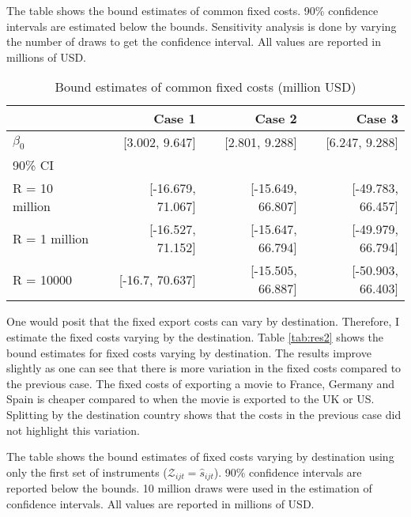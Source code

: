 \documentclass[11pt, letterpaper]{article} \usepackage{amsmath}
\newcommand{\floatintro}[1]{
  
  \vspace*{0.1in}
  
  {\footnotesize

    #1
    
  }
  
  \vspace*{0.1in} } \newcommand{\Hline}{\noindent\rule{18cm}{0.5pt}}
\begin{document}
\begin{table}[htbp!]
  \floatintro{The table shows the bound estimates of common fixed
    costs. 90\% confidence intervals are estimated below the
    bounds. Sensitivity analysis is done by varying the number of
    draws to get the confidence interval. All values are reported in
    millions of USD.}
  \centering
  \begin{tabular}{lrrr}
    \hline
    & Case 1 & Case 2 & Case 3 \\
    \hline
    $\beta_0$ & {[}3.002, 9.647{]} & {[}2.801, 9.288{]} & {[}6.247, 9.288{]} \\
    90\% CI &  &  &  \\
    R = 10 million & {[}-16.679, 71.067{]} & {[}-15.649, 66.807{]} & {[}-49.783, 66.457{]} \\
    R = 1 million & {[}-16.527, 71.152{]} & {[}-15.647, 66.794{]} & {[}-49.979, 66.794{]} \\
    R = 10000 & {[}-16.7, 70.637{]} & {[}-15.505, 66.887{]} &
                                                              {[}-50.903, 66.403{]}\\
    \hline
  \end{tabular}
  \caption{Bound estimates of common fixed costs (million USD)}
  \label{tab:res1}
\end{table}
One would posit that the fixed export costs can vary by
destination. Therefore, I estimate the fixed costs varying by the
destination. Table \ref{tab:res2} shows the bound estimates for fixed
costs varying by destination. The results improve slightly as one can
see that there is more variation in the fixed costs compared to the
previous case. The fixed costs of exporting a movie to France, Germany
and Spain is cheaper compared to when the movie is exported to the UK
or US. Splitting by the destination country shows that the costs in
the previous case did not highlight this variation.
\begin{table}[htbp!]
  \floatintro{The table shows the bound estimates of fixed costs
    varying by destination using only the first set of instruments
    ($\mathcal{Z}_{ijt} = \hat s_{ijt}$). 90\% confidence intervals are reported
    below the bounds. 10 million draws were used in the estimation of
    confidence intervals. All values are
    reported in millions of USD.}
  \centering
  \caption{Bound estimates of fixed costs varying by destination
    (million USD)}
  \label{tab:res2}
\end{table}
\end{document}

